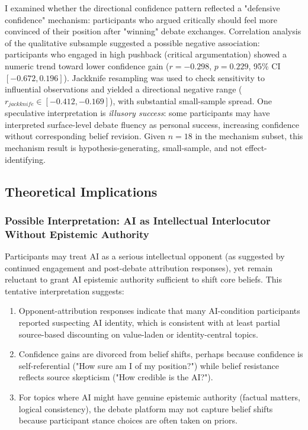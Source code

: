 I examined whether the directional confidence pattern reflected a "defensive confidence" mechanism:
participants who argued critically should feel more convinced of their position after "winning" debate exchanges.
Correlation analysis of the qualitative subsample suggested a possible negative association:
participants who engaged in high pushback (critical argumentation) showed a numeric trend toward lower confidence gain
($r = -0.298$, $p = 0.229$, 95\% CI $[-0.672,0.196]$). Jackknife resampling
was used to check sensitivity to influential observations and yielded a directional negative range
($r_{jackknife} \in [-0.412,-0.169]$), with substantial small-sample spread.
One speculative interpretation is \textit{illusory success}: some participants may have interpreted
surface-level debate fluency as personal success, increasing confidence without corresponding belief revision.
Given $n=18$ in the mechanism subset, this mechanism result is hypothesis-generating,
small-sample, and not effect-identifying.

\subsection{Theoretical Implications}

\subsubsection{Possible Interpretation: AI as Intellectual Interlocutor Without Epistemic Authority}

Participants may treat AI as a serious intellectual opponent (as suggested by continued engagement and post-debate attribution responses),
yet remain reluctant to grant AI epistemic authority sufficient to shift core beliefs. This tentative interpretation suggests:

\begin{enumerate}
      \item Opponent-attribution responses indicate that many AI-condition participants reported suspecting AI identity,
              which is consistent with at least partial source-based discounting on
          value-laden or identity-central topics.
    \item Confidence gains are divorced from belief shifts, perhaps because confidence is self-referential
          ("How sure am I of my position?") while belief resistance reflects source skepticism ("How credible is the AI?").
    \item For topics where AI might have genuine epistemic authority (factual matters, logical consistency),
          the debate platform may not capture belief shifts because participant stance choices are often taken on priors.
\end{enumerate}

